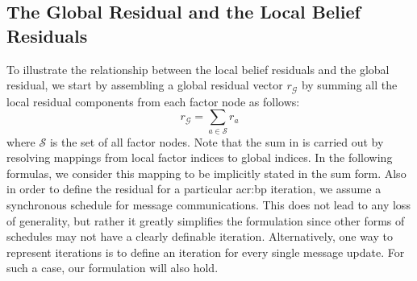 \subsection{The Global Residual and the Local Belief Residuals}

To illustrate the relationship between the local belief residuals and the global residual, we start by assembling a global residual vector $r_{\mathcal{G}}$ by summing all the local residual components from each factor node as follows:
\begin{equation}
	r_{\mathcal{G}} = \sum_{a \in \mathcal{S}} r_a \label{eqn:glbResSum}
\end{equation}
where $\mathcal{S}$ is the set of all factor nodes.  
Note that the sum in  is carried out by resolving mappings from local factor indices to global indices.
In the following formulas, we consider this mapping to be implicitly stated in the sum form.
Also in order to define the residual for a particular \gls{acr:bp} iteration, we assume a synchronous schedule for message communications.
This does not lead to any loss of generality, but rather it greatly simplifies the formulation since other forms of schedules may not have a clearly definable iteration.
Alternatively, one way to represent iterations is to define an iteration for every single message update.
For such a case, our formulation will also hold.


